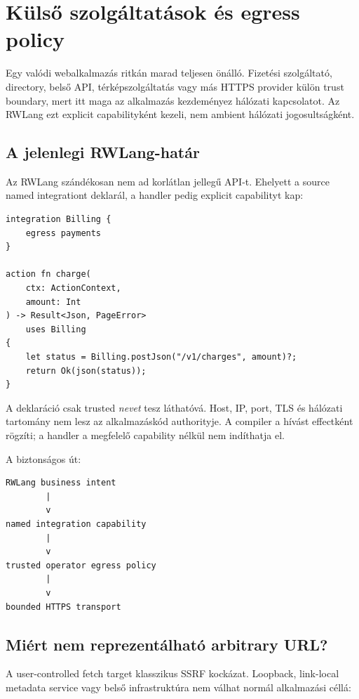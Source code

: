 \chapter{Külső szolgáltatások és egress policy}

Egy valódi webalkalmazás ritkán marad teljesen önálló. Fizetési szolgáltató, directory, belső API, térképszolgáltatás vagy más HTTPS provider külön trust boundary, mert itt maga az alkalmazás kezdeményez hálózati kapcsolatot. Az RWLang ezt explicit capabilityként kezeli, nem ambient hálózati jogosultságként.

\section{A jelenlegi RWLang-határ}

Az RWLang szándékosan nem ad korlátlan  jellegű API-t. Ehelyett a source named integrationt deklarál, a handler pedig explicit capabilityt kap:

\begin{lstlisting}[language=RWLang]
integration Billing {
    egress payments
}

action fn charge(
    ctx: ActionContext,
    amount: Int
) -> Result<Json, PageError>
    uses Billing
{
    let status = Billing.postJson("/v1/charges", amount)?;
    return Ok(json(status));
}
\end{lstlisting}

A deklaráció csak trusted \emph{nevet} tesz láthatóvá. Host, IP, port, TLS és hálózati tartomány nem lesz az alkalmazáskód authorityje. A compiler a hívást  effectként rögzíti; a handler a megfelelő  capability nélkül nem indíthatja el.

A biztonságos út:

\begin{lstlisting}
RWLang business intent
        |
        v
named integration capability
        |
        v
trusted operator egress policy
        |
        v
bounded HTTPS transport
\end{lstlisting}

\section{Miért nem reprezentálható arbitrary URL?}

A user-controlled fetch target klasszikus SSRF kockázat. Loopback, link-local metadata service vagy belső infrastruktúra nem válhat normál alkalmazási céllá:

